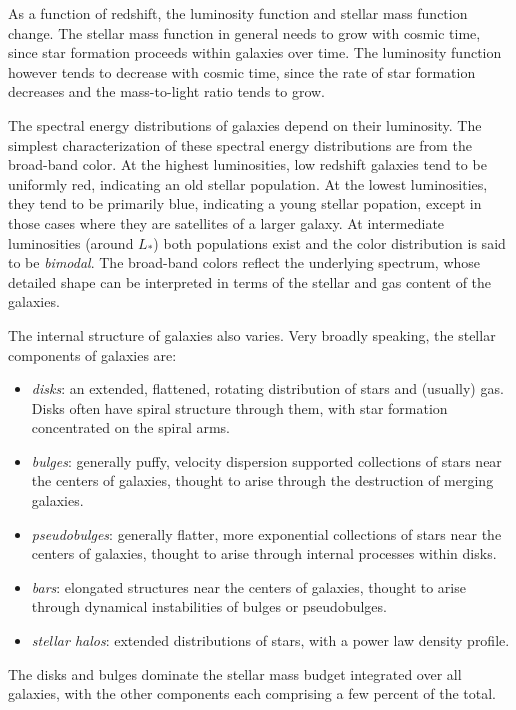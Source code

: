 As a function of redshift, the luminosity function and stellar mass
function change. The stellar mass function in general needs to grow
with cosmic time, since star formation proceeds within galaxies over
time. The luminosity function however tends to decrease with cosmic
time, since the rate of star formation decreases and the mass-to-light
ratio tends to grow.

The spectral energy distributions of galaxies depend on their
luminosity. The simplest characterization of these spectral energy
distributions are from the broad-band color. At the highest
luminosities, low redshift galaxies tend to be uniformly red,
indicating an old stellar population. At the lowest luminosities, they
tend to be primarily blue, indicating a young stellar popation, except
in those cases where they are satellites of a larger galaxy. At
intermediate luminosities (around $L_\ast$) both populations exist and
the color distribution is said to be {\it bimodal}. The broad-band
colors reflect the underlying spectrum, whose detailed shape can be
interpreted in terms of the stellar and gas content of the galaxies.

The internal structure of galaxies also varies. Very broadly speaking,
the stellar components of galaxies are:
\begin{itemize}
 \item {\it disks}: an extended, flattened, rotating distribution of
 stars and (usually) gas. Disks often have spiral structure through
 them, with star formation concentrated on the spiral arms.
 \item {\it bulges}: generally puffy, velocity dispersion supported
  collections of stars near the centers of galaxies, thought to arise
  through the destruction of merging galaxies. 
 \item {\it pseudobulges}: generally flatter, more exponential
   collections of stars near the centers of galaxies, thought to arise
   through internal processes within disks. 
 \item {\it bars}: elongated structures near the centers of galaxies,
   thought to arise through dynamical instabilities of bulges or
   pseudobulges. 
 \item {\it stellar halos}: extended distributions of stars, with a
 power law density profile.
\end{itemize}
The disks and bulges dominate the stellar mass budget integrated over
all galaxies, with the other components each comprising a few percent
of the total.

